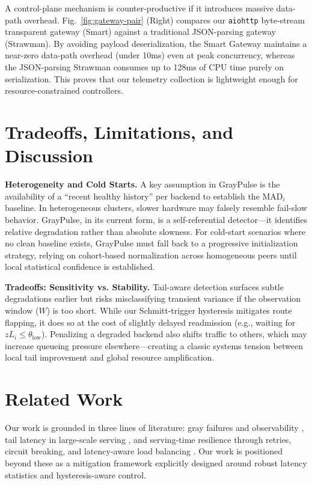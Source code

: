 \documentclass[12pt,conference]{IEEEtran}
\begin{document}
A control-plane mechanism is counter-productive if it introduces massive data-path overhead. Fig.~\ref{fig:gateway-pair} (Right) compares our \texttt{aiohttp} byte-stream transparent gateway (Smart) against a traditional JSON-parsing gateway (Strawman). By avoiding payload deserialization, the Smart Gateway maintains a near-zero data-path overhead (under 10ms) even at peak concurrency, whereas the JSON-parsing Strawman consumes up to 128ms of CPU time purely on serialization. This proves that our telemetry collection is lightweight enough for resource-constrained controllers.

\section{Tradeoffs, Limitations, and Discussion}

\noindent\textbf{Heterogeneity and Cold Starts.}
A key assumption in GrayPulse is the availability of a ``recent healthy history'' per backend to establish the $\mathrm{MAD}_i$ baseline. In heterogeneous clusters, slower hardware may falsely resemble fail-slow behavior. GrayPulse, in its current form, is a self-referential detector—it identifies relative degradation rather than absolute slowness. For cold-start scenarios where no clean baseline exists, GrayPulse must fall back to a progressive initialization strategy, relying on cohort-based normalization across homogeneous peers until local statistical confidence is established.

\noindent\textbf{Tradeoffs: Sensitivity vs. Stability.}
Tail-aware detection surfaces subtle degradations earlier but risks misclassifying transient variance if the observation window ($W$) is too short. While our Schmitt-trigger hysteresis mitigates route flapping, it does so at the cost of slightly delayed readmission (e.g., waiting for $zL_i \leq \theta_{\text{low}}$). Penalizing a degraded backend also shifts traffic to others, which may increase queueing pressure elsewhere—creating a classic systems tension between local tail improvement and global resource amplification.

\section{Related Work}

Our work is grounded in three lines of literature: gray failures and observability \cite{grayfailure, failslowhw, greyhound}, tail latency in large-scale serving \cite{tailatscale}, and serving-time resilience through retries, circuit breaking, and latency-aware load balancing \cite{envoy, linkerd, tower}. Our work is positioned beyond these as a mitigation framework explicitly designed around robust latency statistics and hysteresis-aware control.
\end{document}
